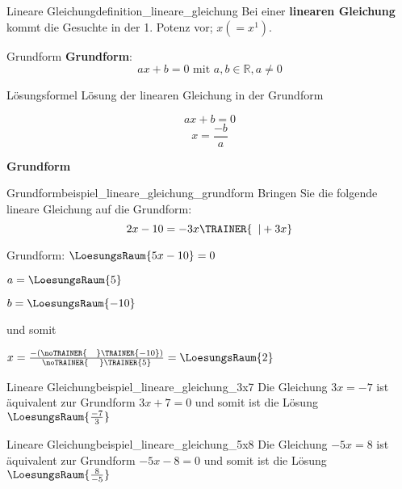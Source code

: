 \begin{definition}{Lineare Gleichung}{definition_lineare_gleichung}
  Bei einer \textbf{linearen Gleichung} kommt die Gesuchte in der
  1. Potenz vor; \zB $x (= x^1)$.
\end{definition}

\begin{definition}{Grundform}{}
  \textbf{Grundform}:\\
  $$ax+b=0 \text{ mit } a,b\in\mathbb{R}, a\ne 0$$
  
  \end{definition}

\begin{gesetz}{Lösungsformel}{}
 Lösung der linearen Gleichung in der Grundform

 $$ax+b=0$$
  $$x = \frac{-b}a$$
  
\end{gesetz}

\newpage
\textbf{Grundform}\\

\begin{beispiel}{Grundform}{beispiel_lineare_gleichung_grundform}
  Bringen Sie die folgende lineare Gleichung auf die Grundform:
  $$2x-10 = -3x\TRAINER{\,\,\,| +3x}$$

  Grundform: $\LoesungsRaum{5x-10} = 0$

  $a = \LoesungsRaum{5}$

  $b = \LoesungsRaum{-10}$

  und somit

  \LARGE{$x=\frac{-(\noTRAINER{\,\,\,\,\,\,}\TRAINER{-10})}{\noTRAINER{\,\,\,\,\,\,\,}\TRAINER{5}}
    = \LoesungsRaum{2}$}

\end{beispiel}


\begin{beispiel}{Lineare Gleichung}{beispiel_lineare_gleichung_3x7}
  Die Gleichung $3x=-7$ ist äquivalent zur Grundform $3x+7=0$ und somit ist die Lösung $\LoesungsRaum{\frac{-7}{3}}$
  \end{beispiel}

\begin{beispiel}{Lineare Gleichung}{beispiel_lineare_gleichung_5x8}
  Die Gleichung $-5x=8$ ist äquivalent zur Grundform $-5x-8=0$ und somit ist die Lösung $\LoesungsRaum{\frac{8}{-5}}$
\end{beispiel}
\newpage

